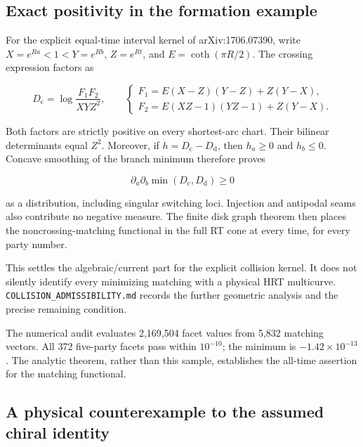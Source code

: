 \documentclass[11pt]{article}
\begin{document}
\subsection{Exact positivity in the formation
example}\label{exact-positivity-in-the-formation-example}

For the explicit equal-time interval kernel of arXiv:1706.07390, write
\(X=e^{Ra}<1<Y=e^{Rb}\), \(Z=e^{Rt}\), and \(E=\coth(\pi R/2)\). The
crossing expression factors as

\[
D_{\mathrm c}=\log\frac{F_1F_2}{XYZ^2},\qquad
\begin{cases}
F_1=E(X-Z)(Y-Z)+Z(Y-X),\\
F_2=E(XZ-1)(YZ-1)+Z(Y-X).
\end{cases}
\]

Both factors are strictly positive on every shortest-arc chart. Their
bilinear determinants equal \(Z^2\). Moreover, if
\(h=D_{\mathrm c}-D_{\mathrm d}\), then \(h_a\ge0\) and \(h_b\le0\).
Concave smoothing of the branch minimum therefore proves

\[
\partial_a\partial_b\min(D_{\mathrm c},D_{\mathrm d})\ge0
\]

as a distribution, including singular switching loci. Injection and
antipodal seams also contribute no negative measure. The finite disk
graph theorem then places the noncrossing-matching functional in the
full RT cone at every time, for every party number.

This settles the algebraic/current part for the explicit collision
kernel. It does not silently identify every minimizing matching with a
physical HRT multicurve. \texttt{COLLISION\_\allowbreak ADMISSIBILITY.md} records
the further geometric analysis and the precise remaining condition.

The numerical audit evaluates 2,169,504 facet values from 5,832 matching
vectors. All 372 five-party facets pass within \(10^{-10}\); the minimum
is \(-1.42\times10^{-13}\). The analytic theorem, rather than this
sample, establishes the all-time assertion for the matching functional.

\subsection{A physical counterexample to the assumed chiral
identity}\label{a-physical-counterexample-to-the-assumed-chiral-identity}
\end{document}
